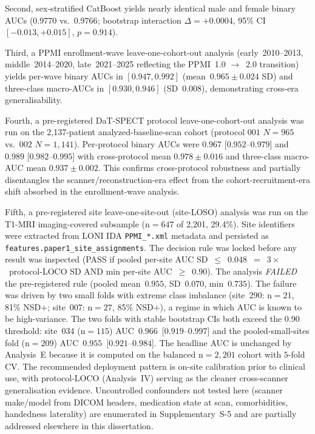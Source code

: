 Second, sex-stratified CatBoost yields nearly identical male and female binary AUCs ($0.9770$ vs.\ $0.9766$; bootstrap interaction $\Delta{=}{+}0.0004$, 95\% CI~$[-0.013, +0.015]$, $p{=}0.914$).

Third, a PPMI enrollment-wave leave-one-cohort-out analysis (early~2010--2013, middle~2014--2020, late~2021--2025 reflecting the PPMI~1.0 $\rightarrow$~2.0 transition) yields per-wave binary AUCs in $[0.947, 0.992]$ (mean~$0.965 \pm 0.024$ SD) and three-class macro-AUCs in $[0.930, 0.946]$ (SD~$0.008$), demonstrating cross-era generalisability.

Fourth, a pre-registered DaT-SPECT protocol leave-one-cohort-out analysis was run on the 2{,}137-patient analyzed-baseline-scan cohort (protocol $001$ $N{=}965$ vs.\ $002$ $N{=}1{,}141$). Per-protocol binary AUCs were $0.967$ [$0.952$--$0.979$] and $0.989$ [$0.982$--$0.995$] with cross-protocol mean $0.978 \pm 0.016$ and three-class macro-AUC mean $0.937 \pm 0.002$. This confirms cross-protocol robustness and partially disentangles the scanner/reconstruction-era effect from the cohort-recruitment-era shift absorbed in the enrollment-wave analysis.

Fifth, a pre-registered site leave-one-site-out (site-LOSO) analysis was run on the T1-MRI imaging-covered subsample (n${=}647$ of 2{,}201, 29.4\%). Site identifiers were extracted from LONI IDA \texttt{PPMI\_*.xml} metadata and persisted as \texttt{features.paper1\_site\_assignments}. The decision rule was locked before any result was inspected (PASS if pooled per-site AUC SD~${\le}$~$0.048$~${=}$~$3{\times}$~protocol-LOCO SD AND min per-site AUC~${\ge}$~$0.90$). The analysis \emph{FAILED} the pre-registered rule (pooled mean~$0.955$, SD~$0.070$, min~$0.735$). The failure was driven by two small folds with extreme class imbalance (site~290: n${=}21$, 81\% NSD$+$; site~007: n${=}27$, 85\% NSD$+$), a regime in which AUC is known to be high-variance. The two folds with stable bootstrap CIs both exceed the 0.90 threshold: site~034 (n${=}115$) AUC~$0.966$~[$0.919$--$0.997$] and the pooled-small-sites fold (n${=}209$) AUC~$0.955$~[$0.921$--$0.984$]. The headline AUC is unchanged by Analysis~E because it is computed on the balanced n${=}2{,}201$ cohort with $5$-fold CV. The recommended deployment pattern is on-site calibration prior to clinical use, with protocol-LOCO (Analysis~IV) serving as the cleaner cross-scanner generalisation evidence. Uncontrolled confounders not tested here (scanner make/model from DICOM headers, medication state at scan, comorbidities, handedness laterality) are enumerated in Supplementary~S-5 and are partially addressed elsewhere in this dissertation.

